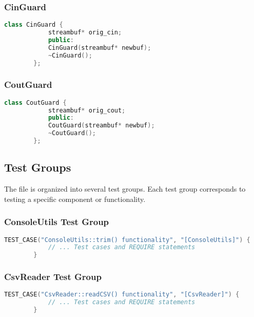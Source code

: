 \documentclass{article}
\begin{document}
	\subsubsection*{CinGuard}
	\begin{mdframed}[backgroundcolor=background, hidealllines=false, innerleftmargin=15pt, innerrightmargin=5pt, innertopmargin=0pt, innerbottommargin=-5pt]
	\begin{lstlisting}[language=C++]
		class CinGuard {
			streambuf* orig_cin;
			public:
			CinGuard(streambuf* newbuf);
			~CinGuard();
		};
	\end{lstlisting}
\end{mdframed}
	

	\subsubsection*{CoutGuard}
	\begin{mdframed}[backgroundcolor=background, hidealllines=false, innerleftmargin=15pt, innerrightmargin=5pt, innertopmargin=0pt, innerbottommargin=-5pt]
	\begin{lstlisting}[language=C++]
		class CoutGuard {
			streambuf* orig_cout;
			public:
			CoutGuard(streambuf* newbuf);
			~CoutGuard();
		};
	\end{lstlisting}
	\end{mdframed}
	
	\subsection*{Test Groups}
	The file is organized into several test groups. Each test group corresponds to testing a specific component or functionality.
	
	\subsubsection*{ConsoleUtils Test Group}
	\begin{mdframed}[backgroundcolor=background, hidealllines=false, innerleftmargin=15pt, innerrightmargin=5pt, innertopmargin=-5pt, innerbottommargin=-7pt]
	\begin{lstlisting}[language=C++]
		TEST_CASE("ConsoleUtils::trim() functionality", "[ConsoleUtils]") {
			// ... Test cases and REQUIRE statements
		}
	\end{lstlisting}
	\end{mdframed}
	
	\subsubsection*{CsvReader Test Group}
	\begin{mdframed}[backgroundcolor=background, hidealllines=false, innerleftmargin=15pt, innerrightmargin=5pt, innertopmargin=-5pt, innerbottommargin=-7pt]
	\begin{lstlisting}[language=C++]
		TEST_CASE("CsvReader::readCSV() functionality", "[CsvReader]") {
			// ... Test cases and REQUIRE statements
		}
	\end{lstlisting}
	\end{mdframed}
	
\end{document}
